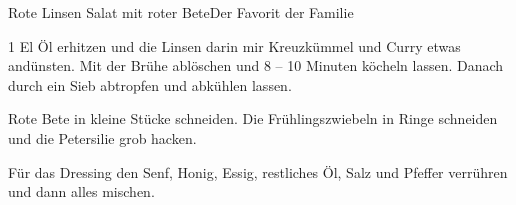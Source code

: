 \begin{recipe}{Rote Linsen Salat mit roter Bete}{Der Favorit der Familie}
  \label{Rote Linsen Salat}
  \inglist

  \steps

  1 El Öl erhitzen und die Linsen darin mir Kreuzkümmel und Curry etwas
  andünsten. Mit der Brühe ablöschen und 8 -- 10 Minuten köcheln lassen. Danach
  durch ein Sieb abtropfen und abkühlen lassen.

  Rote Bete in kleine Stücke schneiden. Die Frühlingszwiebeln in Ringe schneiden
  und die Petersilie grob hacken.

  Für das Dressing den Senf, Honig, Essig,
  restliches Öl, Salz und Pfeffer verrühren und dann alles mischen.
  
\end{recipe}

